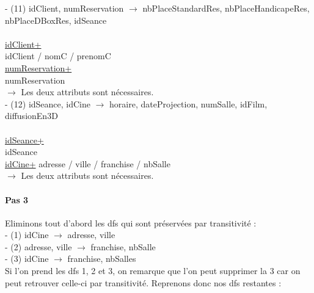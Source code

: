\documentclass[a4paper,sffamily,12pt]{article}
\begin{document}
					\noindent - (11) idClient, numReservation $\rightarrow$ nbPlaceStandardRes, nbPlaceHandicapeRes, nbPlaceDBoxRes, idSeance \\
						\\
						\underline{idClient+} \\
						idClient / nomC / prenomC \\
						\underline{numReservation+} \\
						numReservation \\	
					$\rightarrow$ Les deux attributs sont nécessaires. \\					
					
					\noindent - (12) idSeance, idCine $\rightarrow$ horaire, dateProjection, numSalle, idFilm, diffusionEn3D \\												
						\\
						\underline{idSeance+}\\
						idSeance \\
						\underline{idCine+}
						adresse / ville / franchise / nbSalle \\
					$\rightarrow$ Les deux attributs sont nécessaires. \\
	
					\vspace{0.5cm}
	
				\paragraph{Pas 3}		
		
					\vspace{0.5cm}
		
					\noindent Eliminons tout d'abord les dfs qui sont préservées par transitivité : \\
		
						\noindent- (1) idCine $\rightarrow$ adresse, ville \\
						- (2) adresse, ville $\rightarrow$ franchise, nbSalle \\
						- (3) idCine $\rightarrow$ franchise, nbSalles \\
						
					Si l'on prend les dfs 1, 2 et 3, on remarque que l'on peut supprimer la 3 car on peut retrouver celle-ci par transitivité. Reprenons donc nos dfs restantes : \\
						
\end{document}
